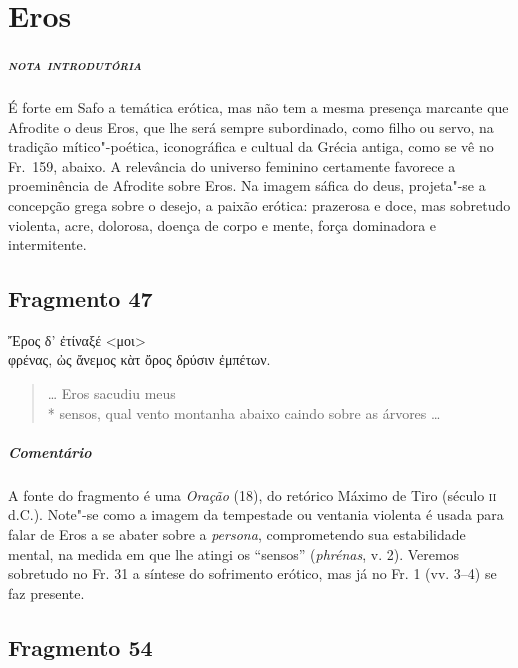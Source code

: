 \chapter{Eros}

\paragraph{\textsc{nota introdutória}} 
É forte em Safo a temática erótica, mas não tem a mesma presença marcante que
Afrodite o deus Eros, que lhe será sempre subordinado, como filho ou servo, na
tradição mítico"-poética, iconográfica e cultual da Grécia antiga, como se vê no
Fr.~159, abaixo. A relevância do universo feminino certamente favorece a
proeminência de Afrodite sobre Eros. Na imagem sáfica do deus, projeta"-se a
concepção grega sobre o desejo, a paixão erótica: prazerosa e doce, mas
sobretudo violenta, acre, dolorosa, doença de corpo e mente, força dominadora e
intermitente.

\section{Fragmento 47}

\begin{gkverse}
Ἔρος δ’ ἐτίναξέ <μοι>\\
φρένας, ὠς ἄνεμος κὰτ ὄρος δρύσιν ἐμπέτων.
\end{gkverse}

\begin{verse}
\ldots{} Eros sacudiu meus\\*
sensos, qual vento montanha abaixo caindo sobre as árvores \ldots{}
\end{verse}

\paragraph{Comentário} A fonte do fragmento é uma \textit{Oração} (18), do retórico Máximo de Tiro (século \textsc{ii} d.C.).
Note"-se como a imagem da tempestade ou ventania violenta é usada para falar de Eros a se abater sobre a \textit{persona}, comprometendo sua estabilidade mental, na medida em que lhe atingi os ``sensos'' (\textit{phrénas}, v. 2). Veremos sobretudo no Fr. 31 a síntese do sofrimento erótico, mas já no Fr. 1 (vv. 3--4) se faz presente.



\pagebreak
\section{Fragmento 54}


